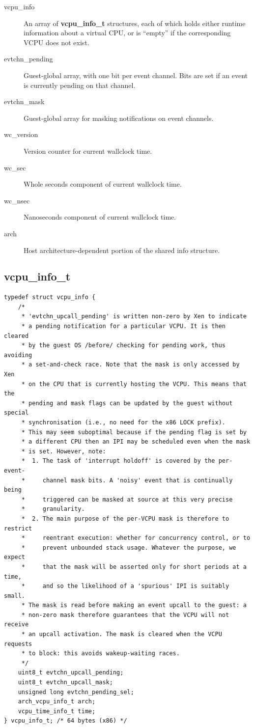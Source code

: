 \documentclass[11pt,twoside,final,openright]{report}
\begin{document}
\begin{description}
\item[vcpu\_info] An array of {\bf vcpu\_info\_t} structures, each of
  which holds either runtime information about a virtual CPU, or is
  ``empty'' if the corresponding VCPU does not exist.
\item[evtchn\_pending] Guest-global array, with one bit per event
  channel.  Bits are set if an event is currently pending on that
  channel.
\item[evtchn\_mask] Guest-global array for masking notifications on
  event channels.
\item[wc\_version] Version counter for current wallclock time.
\item[wc\_sec] Whole seconds component of current wallclock time.
\item[wc\_nsec] Nanoseconds component of current wallclock time.
\item[arch] Host architecture-dependent portion of the shared info
  structure.
\end{description}

\subsection{vcpu\_info\_t}

\scriptsize
\begin{verbatim}
typedef struct vcpu_info {
    /*
     * 'evtchn_upcall_pending' is written non-zero by Xen to indicate
     * a pending notification for a particular VCPU. It is then cleared 
     * by the guest OS /before/ checking for pending work, thus avoiding
     * a set-and-check race. Note that the mask is only accessed by Xen
     * on the CPU that is currently hosting the VCPU. This means that the
     * pending and mask flags can be updated by the guest without special
     * synchronisation (i.e., no need for the x86 LOCK prefix).
     * This may seem suboptimal because if the pending flag is set by
     * a different CPU then an IPI may be scheduled even when the mask
     * is set. However, note:
     *  1. The task of 'interrupt holdoff' is covered by the per-event-
     *     channel mask bits. A 'noisy' event that is continually being
     *     triggered can be masked at source at this very precise
     *     granularity.
     *  2. The main purpose of the per-VCPU mask is therefore to restrict
     *     reentrant execution: whether for concurrency control, or to
     *     prevent unbounded stack usage. Whatever the purpose, we expect
     *     that the mask will be asserted only for short periods at a time,
     *     and so the likelihood of a 'spurious' IPI is suitably small.
     * The mask is read before making an event upcall to the guest: a
     * non-zero mask therefore guarantees that the VCPU will not receive
     * an upcall activation. The mask is cleared when the VCPU requests
     * to block: this avoids wakeup-waiting races.
     */
    uint8_t evtchn_upcall_pending;
    uint8_t evtchn_upcall_mask;
    unsigned long evtchn_pending_sel;
    arch_vcpu_info_t arch;
    vcpu_time_info_t time;
} vcpu_info_t; /* 64 bytes (x86) */
\end{verbatim}
\normalsize
\end{document}
